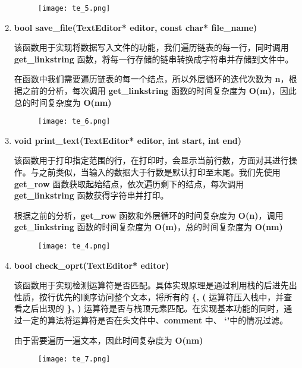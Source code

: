 \begin{enumerate}
\begin{figure*}[htbp]
                        \texttt{[image: te\_5.png]}
                    \end{figure*}
                \newpage
                \item \textbf{bool save\_file(TextEditor* editor, const char* file\_name)}
                    \par 该函数用于实现将数据写入文件的功能，我们遍历链表的每一行，同时调用 \textbf{get\_linkstring} 函数，将每一行存储的链串转换成字符串并存储到文件中。
                    \par 在函数中我们需要遍历链表的每一个结点，所以外层循环的迭代次数为 \textbf{n}，根据之前的分析，每次调用 \textbf{get\_linkstring} 函数的时间复杂度为 \textbf{O(m)}，因此总的时间复杂度为 \textbf{O(nm)}
                    \begin{figure*}[htbp]
                        \texttt{[image: te\_6.png]}
                    \end{figure*}
                \newpage
                \item \textbf{void print\_text(TextEditor* editor, int start, int end)}
                    \par 该函数用于打印指定范围的行，在打印时，会显示当前行数，方面对其进行操作。与之前类似，当输入的数据大于行数是默认打印至末尾。我们先使用 \textbf{get\_row} 函数获取起始结点，依次遍历剩下的结点，每次调用 \textbf{get\_linkstring} 函数获得字符串并打印。
                    \par 根据之前的分析，\textbf{get\_row} 函数和外层循环的时间复杂度为 \textbf{O(n)}，调用 \textbf{get\_linkstring} 函数的时间复杂度为 \textbf{O(m)}，总的时间复杂度为 \textbf{O(nm)}
                    \begin{figure*}[htbp]
                        \texttt{[image: te\_4.png]}
                    \end{figure*}
                \item \textbf{bool check\_oprt(TextEditor* editor)}
                    \par 该函数用于实现检测运算符是否匹配。具体实现原理是通过利用栈的后进先出性质，按行优先的顺序访问整个文本，将所有的 \textbf{\{, (} 运算符压入栈中，并查看之后出现的 \textbf{\}, )} 运算符是否与栈顶元素匹配。在实现基本功能的同时，通过一定的算法将运算符是否在头文件中、\textbf{comment} 中、 \textbf{`'}中的情况过滤。
                    \par 由于需要遍历一遍文本，因此时间复杂度为 \textbf{O(nm)}
                    \begin{figure*}[htbp]
                        \texttt{[image: te\_7.png]}
                    \end{figure*}
            \end{enumerate}
    \newpage
